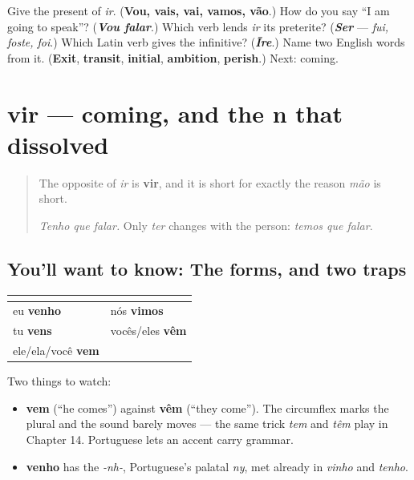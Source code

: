 \begin{tcolorbox}[breakable,colback=teal!4,colframe=teal!35!black,title={Before you move on}]
Give the present of \emph{ir}. (\textbf{Vou, vais, vai, vamos, vão}.) How do you say \textquotedblleft{}I am going to speak\textquotedblright{}? (\emph{\textbf{Vou falar}}.) Which verb lends \emph{ir} its preterite? (\emph{\textbf{Ser}} — \emph{fui, foste, foi}.) Which Latin verb gives the infinitive? (\emph{\textbf{Īre}}.) Name two English words from it. (\textbf{Exit}, \textbf{transit}, \textbf{initial}, \textbf{ambition}, \textbf{perish}.) Next: coming.
\end{tcolorbox}
\section[vir]{vir — coming, and the n that dissolved}

\label{lesson:PT-C18-vir}



\begin{quote}
The opposite of \emph{ir} is \textbf{vir}, and it is short for exactly the reason \emph{mão} is short.

\emph{Tenho que falar.} Only \emph{ter} changes with the person: \emph{temos que falar}.
\end{quote}

\subsection*{You'll want to know: The forms, and two traps}
\noindent
\begin{tabularx}{\linewidth}{@{}>{\raggedright\arraybackslash}X>{\raggedright\arraybackslash}X@{}}
\toprule
\textbf{} & \textbf{} \\
\midrule
eu \textbf{venho} & nós \textbf{vimos} \\
tu \textbf{vens} & vocês/eles \textbf{vêm} \\
ele/ela/você \textbf{vem} &  \\
\bottomrule
\end{tabularx}

Two things to watch:

\begin{itemize}
\raggedright
  \item \textbf{vem} (\textquotedblleft{}he comes\textquotedblright{}) against \textbf{vêm} (\textquotedblleft{}they come\textquotedblright{}). The circumflex marks the plural and the sound barely moves — the same trick \emph{tem} and \emph{têm} play in Chapter 14. Portuguese lets an accent carry grammar.
  \item \textbf{venho} has the \emph{-nh-}, Portuguese's palatal \emph{ny}, met already in \emph{vinho} and \emph{tenho}.
\end{itemize}

